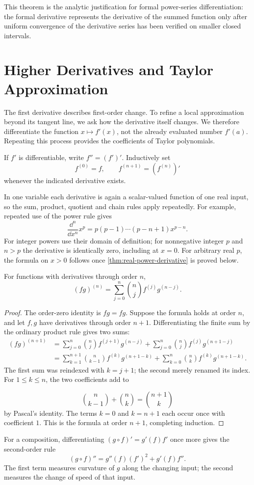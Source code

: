This theorem is the analytic justification for formal power-series differentiation: the formal derivative represents the derivative of the summed function only after uniform convergence of the derivative series has been verified on smaller closed intervals.

\section{Higher Derivatives and Taylor Approximation}

The first derivative describes first-order change. To refine a local
approximation beyond its tangent line, we ask how the derivative itself
changes. We therefore differentiate the function $x\mapsto f'(x)$,
not the already evaluated number $f'(a)$. Repeating this process provides
the coefficients of Taylor polynomials.

\label{sec:ordinary-higher-derivatives}
\begin{definition}
If $f'$ is differentiable, write $f''=(f')'$. Inductively set
\[
f^{(0)}=f,\qquad f^{(n+1)}=(f^{(n)})'
\]
whenever the indicated derivative exists.
\end{definition}
In one variable each derivative is again a scalar-valued function of one
real input, so the sum, product, quotient and chain rules apply repeatedly.
For example, repeated use of the power rule gives
\[
\frac{\dd^n}{\dd x^n}x^p
=p(p-1)\cdots(p-n+1)x^{p-n}.
\]
For integer powers use their domain of definition; for nonnegative integer
$p$ and $n>p$ the derivative is identically zero, including at $x=0$.
For arbitrary real $p$, the formula on $x>0$ follows once
\cref{thm:real-power-derivative} is proved below.

\begin{proposition}\label{prop:higher-leibniz}
For functions with derivatives through order $n$,
\[
(fg)^{(n)}=\sum_{j=0}^n\binom nj f^{(j)}g^{(n-j)}.
\]
\end{proposition}
\begin{proof}
The order-zero identity is $fg=fg$. Suppose the formula holds at order
$n$, and let $f,g$ have derivatives through order $n+1$. Differentiating
the finite sum by the ordinary product rule gives two sums:
\[
\begin{aligned}
(fg)^{(n+1)}
&=\sum_{j=0}^n\binom nj f^{(j+1)}g^{(n-j)}
 +\sum_{j=0}^n\binom nj f^{(j)}g^{(n+1-j)}\\
&=\sum_{k=1}^{n+1}\binom n{k-1}f^{(k)}g^{(n+1-k)}
 +\sum_{k=0}^n\binom nk f^{(k)}g^{(n+1-k)}.
\end{aligned}
\]
The first sum was reindexed with $k=j+1$; the second merely renamed
its index. For $1\leq k\leq n$, the two coefficients add to

\[
\binom n{k-1}+\binom nk=\binom{n+1}k
\]
 by Pascal's identity.
The terms $k=0$ and $k=n+1$ each occur once with coefficient $1$.
This is the formula at order $n+1$, completing induction.
\end{proof}
For a composition, differentiating $(g\circ f)'=g'(f)f'$ once more
gives the second-order rule
\[
(g\circ f)''=g''(f)(f')^2+g'(f)f''.
\]
The first term measures curvature of $g$ along the changing input; the
second measures the change of speed of that input.

